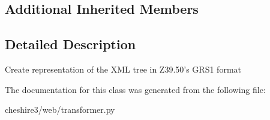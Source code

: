\subsection*{Additional Inherited Members}


\subsection{Detailed Description}
\begin{DoxyVerb}Create representation of the XML tree in Z39.50's GRS1 format \end{DoxyVerb}
 

The documentation for this class was generated from the following file\-:\begin{DoxyCompactItemize}
\item 
cheshire3/web/transformer.\-py\end{DoxyCompactItemize}

